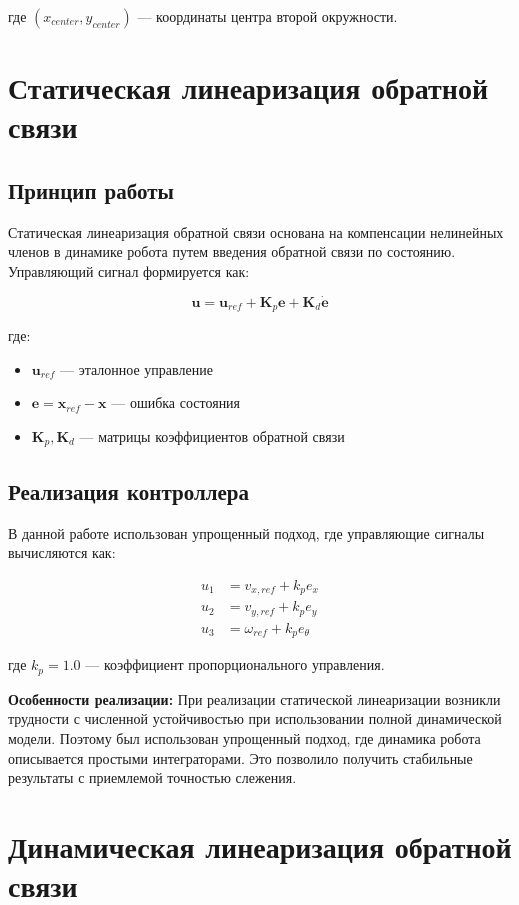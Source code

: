 где $(x_{center}, y_{center})$ --- координаты центра второй окружности.

\section{Статическая линеаризация обратной связи}

\subsection{Принцип работы}

Статическая линеаризация обратной связи основана на компенсации нелинейных членов в динамике робота путем введения обратной связи по состоянию. Управляющий сигнал формируется как:

$$\mathbf{u} = \mathbf{u}_{ref} + \mathbf{K}_p \mathbf{e} + \mathbf{K}_d \dot{\mathbf{e}}$$

где:
\begin{itemize}
\item $\mathbf{u}_{ref}$ --- эталонное управление
\item $\mathbf{e} = \mathbf{x}_{ref} - \mathbf{x}$ --- ошибка состояния
\item $\mathbf{K}_p, \mathbf{K}_d$ --- матрицы коэффициентов обратной связи
\end{itemize}

\subsection{Реализация контроллера}

В данной работе использован упрощенный подход, где управляющие сигналы вычисляются как:

\begin{align}
u_1 &= v_{x,ref} + k_p e_x \\
u_2 &= v_{y,ref} + k_p e_y \\
u_3 &= \omega_{ref} + k_p e_\theta
\end{align}

где $k_p = 1.0$ --- коэффициент пропорционального управления.

\textbf{Особенности реализации:} При реализации статической линеаризации возникли трудности с численной устойчивостью при использовании полной динамической модели. Поэтому был использован упрощенный подход, где динамика робота описывается простыми интеграторами. Это позволило получить стабильные результаты с приемлемой точностью слежения.

\section{Динамическая линеаризация обратной связи}

